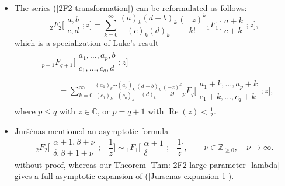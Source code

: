 \documentclass[10pt,a4paper]{amsart}
\numberwithin{equation}{section}
\newcommand{\CC}{\ensuremath{\mathbb{C}}}
\newcommand{\ZZ}{\ensuremath{\mathbb{Z}}}
\begin{document}
\begin{Remark}
	~
	\begin{itemize}\itemsep=0pt
		\item[(1)] The series (\ref{2F2 transformation}) can be reformulated as follows:
		\begin{equation}\label{2F2 transformation reformulated}
			{}_2F_2\biggl[\begin{matrix}
				a,b\\
				c,d
			\end{matrix};z\biggr]=\sum_{k=0}^{\infty}\frac{(a)_k(d-b)_k}{(c)_k(d)_k}\frac{(-z)^k}{k!}{}_1F_1\biggl[\begin{matrix}
				a+k\\
				c+k
			\end{matrix};z\biggr],
		\end{equation}
		which is a specialization of Luke's result \cite[Section~9.1, equation~(34)]{Luke-1969}
		\begin{align}
					&{}_{p+1}F_{q+1}\biggl[\begin{matrix}
						a_1,\dots,a_p,b\\
						c_1,\dots,c_q,d
					\end{matrix};z\biggr]{}\nonumber\\
 & \qquad{}= \sum_{k=0}^{\infty}\frac{ (a_1 )_k\cdots (a_p )_k}{ (c_1 )_k\cdots (c_q )_k}\frac{(d-b)_k}{(d)_k}
 \frac{(-z)^k}{k!}{}_{p}F_{q}\biggl[\begin{matrix}
						a_1+k,\dots,a_p+k\\
						c_1+k,\dots,c_q+k
					\end{matrix};z\biggr],\label{pFp transformation}
\end{align}
			where $p\leqslant q$ with $z\in\CC$, or $p=q+1$ with $\operatorname{Re}(z)<\frac{1}{2}$.
		
		\item[(2)] Jur\v{s}\.enas \cite[Section~4.1, p.~69]{Jursenas-2014} mentioned an asymptotic formula
		\begin{equation}\label{Jursenas expansion-1}
			{}_2F_2\biggl[\begin{matrix}
				\alpha+1,\beta+\nu\\
				\delta,\beta+1+\nu
			\end{matrix};-\frac{1}{z}\biggr]\sim {}_1F_1\biggl[\begin{matrix}
				\alpha+1\\
				\delta
			\end{matrix};-\frac{1}{z}\biggr],\qquad \nu\in\ZZ_{\geqslant 0},\quad\nu\to \infty.
		\end{equation}
		without proof, whereas our Theorem \ref{Thm: 2F2 large parameter--lambda} gives a full asymptotic expansion of (\ref{Jursenas expansion-1}).
	\end{itemize}
\end{Remark}
\end{document}
